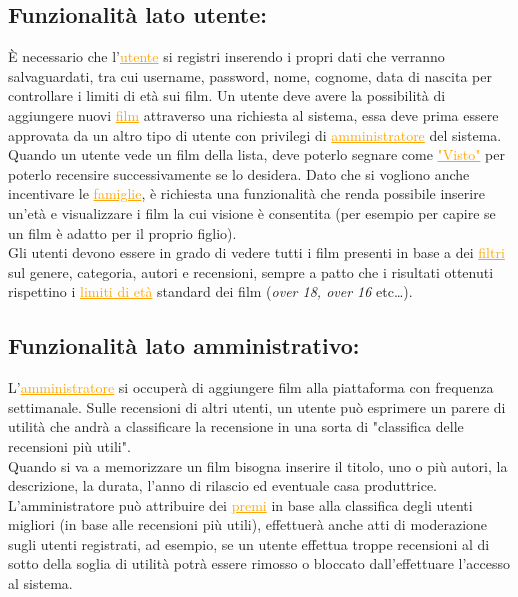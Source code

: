 \documentclass[a4paper,12pt]{report}
\begin{document}
	\subsection{Funzionalità lato utente:}
	È necessario che l'\textcolor{orange}{\underline{utente}} si registri inserendo i propri dati che verranno salvaguardati, tra cui username, password, nome, cognome, data di nascita per controllare i limiti di età sui film. Un utente deve avere la possibilità di aggiungere nuovi \textcolor{orange}{\underline{film}} attraverso una richiesta al sistema, essa deve prima essere approvata da un altro tipo di utente con privilegi di \textcolor{orange}{\underline{amministratore}} del sistema.\\
	Quando un utente vede un film della lista, deve poterlo segnare come \textcolor{orange}{\underline{"Visto"}} per poterlo recensire successivamente se lo desidera. Dato che si vogliono anche incentivare le \textcolor{orange}{\underline{famiglie}}, è richiesta una funzionalità che renda possibile inserire un'età e visualizzare i film la cui visione è consentita (per esempio per capire se un film è adatto per il proprio figlio).\\
	Gli utenti devono essere in grado di vedere tutti i film presenti in base a dei \textcolor{orange}{\underline{filtri}} sul genere, categoria, autori e recensioni, sempre a patto che i risultati ottenuti rispettino i \textcolor{orange}{\underline{limiti di età}} standard dei film (\textit{over 18, over 16} etc\dots).
	\subsection{Funzionalità lato amministrativo:}
	L'\textcolor{orange}{\underline{amministratore}} si occuperà di aggiungere film alla piattaforma con frequenza settimanale. Sulle recensioni di altri utenti, un utente può esprimere un parere di utilità che andrà a classificare la recensione in una sorta di "classifica delle recensioni più utili".\\
	Quando si va a memorizzare un film bisogna inserire il titolo, uno o più autori, la descrizione, la durata, l'anno di rilascio ed eventuale casa produttrice.
	L'amministratore può attribuire dei \textcolor{orange}{\underline{premi}} in base alla classifica degli utenti migliori (in base alle recensioni più utili), effettuerà anche atti di moderazione sugli utenti registrati, ad esempio, se un utente effettua troppe recensioni al di sotto della soglia di utilità potrà essere rimosso o bloccato dall'effettuare l'accesso al sistema.
\end{document}
